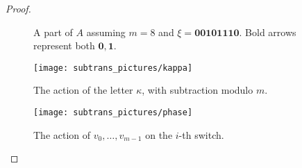 \documentclass{ws-ijmpc}
\begin{document}
\begin{proof}
\begin{figure}
\caption{\label{fig: ex dec}A part of $A$ assuming $m=8$ and $\xi=\mathbf{00101110}$.
Bold arrows represent both $\mathbf{0},\mathbf{1}$.}
\end{figure}
 
\begin{figure}
\begin{minipage}[t]{0.45\columnwidth}\begin{center}
\texttt{[image: subtrans\_pictures/kappa]}\caption{\label{fig: kappa}The action of the letter $\kappa$, with subtraction
modulo $m$.}

\par\end{center}\end{minipage}\hfill{}\begin{minipage}[t]{0.45\columnwidth}\begin{center}
\texttt{[image: subtrans\_pictures/phase]}\caption{\label{fig: phase}The action of $v_{0},\dots,v_{m-1}$ on the $i$-th
switch.}

\par\end{center}\end{minipage}
\end{figure}
 


\end{proof}
\end{document}
